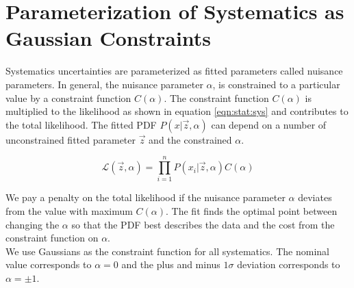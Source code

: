\section{Parameterization of Systematics as Gaussian Constraints}
\label{sec:stat:sys}

\indent Systematics uncertainties are parameterized as fitted parameters called nuisance parameters.  In general, the nuisance parameter $\alpha$, is constrained to a particular value by a constraint function $C(\alpha)$.   The constraint function $C(\alpha)$ is multiplied to the likelihood as shown in equation \ref{eqn:stat:sys} and contributes to the total likelihood.  The fitted PDF $P(x|\vec{z},\alpha)$ can depend on a number of unconstrained fitted parameter $\vec{z}$ and the constrained $\alpha$.  

\begin{equation}
\label{eqn:stat:sys}
{\mathcal{L}}(\vec{z},\alpha) = {\displaystyle\prod_{i=1}^{n}} P(x_i|\vec{z},\alpha) C(\alpha)
\end{equation}


\indent We pay a penalty on the total likelihood if the nuisance parameter $\alpha$ deviates from the value with maximum $C(\alpha)$.  The fit finds the optimal point between changing the $\alpha$ so that the PDF best describes the data and the cost from the constraint function on $\alpha$. \\

\indent We use Gaussians as the constraint function for all systematics.  The nominal value corresponds to $\alpha = 0$ and the plus and minus $1\sigma$ deviation corresponds to $\alpha = \pm1$.  \\


